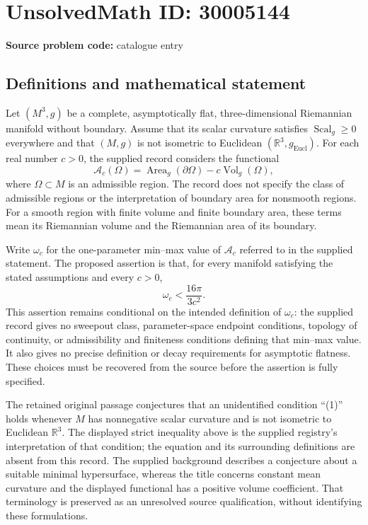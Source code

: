 \documentclass[11pt]{article}
\newcommand{\R}{\mathbb{R}}
\begin{document}
\section*{UnsolvedMath ID: 30005144}
\textbf{Source problem code:} catalogue entry
\subsection{Definitions and mathematical statement}
Let \((M^3,g)\) be a complete, asymptotically flat, three-dimensional Riemannian manifold without boundary. Assume that its scalar curvature satisfies \(\operatorname{Scal}_g\geq 0\) everywhere and that \((M,g)\) is not isometric to Euclidean \((\R^3,g_{\mathrm{Eucl}})\). For each real number \(c>0\), the supplied record considers the functional
\[
\mathcal A_c(\Omega)=\operatorname{Area}_g(\partial\Omega)-c\operatorname{Vol}_g(\Omega),
\]
where \(\Omega\subset M\) is an admissible region. The record does not specify the class of admissible regions or the interpretation of boundary area for nonsmooth regions. For a smooth region with finite volume and finite boundary area, these terms mean its Riemannian volume and the Riemannian area of its boundary.

Write \(\omega_c\) for the one-parameter min--max value of \(\mathcal A_c\) referred to in the supplied statement. The proposed assertion is that, for every manifold satisfying the stated assumptions and every \(c>0\),
\[
\omega_c<\frac{16\pi}{3c^2}.
\]
This assertion remains conditional on the intended definition of \(\omega_c\): the supplied record gives no sweepout class, parameter-space endpoint conditions, topology of continuity, or admissibility and finiteness conditions defining that min--max value. It also gives no precise definition or decay requirements for asymptotic flatness. These choices must be recovered from the source before the assertion is fully specified.

The retained original passage conjectures that an unidentified condition ``(1)'' holds whenever \(M\) has nonnegative scalar curvature and is not isometric to Euclidean \(\R^3\). The displayed strict inequality above is the supplied registry's interpretation of that condition; the equation and its surrounding definitions are absent from this record. The supplied background describes a conjecture about a suitable minimal hypersurface, whereas the title concerns constant mean curvature and the displayed functional has a positive volume coefficient. That terminology is preserved as an unresolved source qualification, without identifying these formulations.
\end{document}
